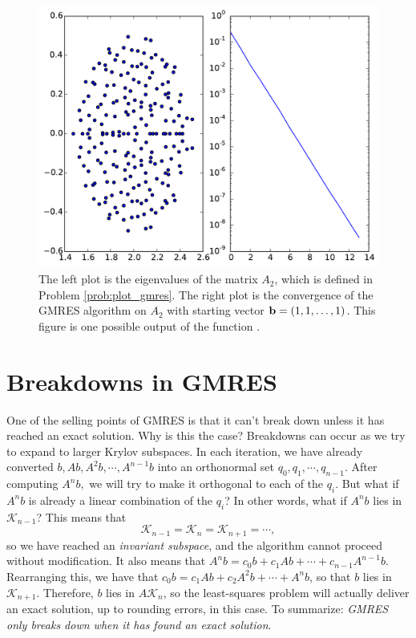 \begin{problem}
\begin{figure}[H]
\includegraphics[width=.7\textwidth]{plot_gmres.pdf}
\caption{The left plot is the eigenvalues of the matrix $A_2$, which is defined in Problem \ref{prob:plot_gmres}.
The right plot is the convergence of the GMRES algorithm on $A_2$ with starting vector ${\bf b} = (1, 1, \ldots, 1)$.
This figure is one possible output of the function .}
\label{fig:plot_gmres}
\end{figure}
\end{problem}



\section*{Breakdowns in GMRES}
One of the selling points of GMRES is that it can't break down unless it has reached an exact solution.
Why is this the case?
Breakdowns can occur as we try to expand to larger Krylov subspaces.
In each iteration, we have already converted $b,Ab,A^{2}b,\cdots, A^{n-1}b$ into an orthonormal set $q_0,q_1,\cdots,q_{n-1}$.
After computing $A^nb,$ we will try to make it orthogonal to each of the $q_i$.
But what if $A^{n}b$ is already a linear combination of the $q_i$? In other words, what if $A^{n}b$ lies in $\mathcal{K}_{n-1}$?
This means that
\[
\mathcal{K}_{n-1}=\mathcal{K}_n=\mathcal{K}_{n+1}=\cdots,
\]
so we have reached an \emph{invariant subspace},
and the algorithm cannot proceed without modification.
It also means that $A^{n}b = c_0 b + c_1 A b + \cdots + c_{n-1}A^{n-1}b$.
Rearranging this, we have that $c_0 b = c_1 A b + c_2 A^{2} b + \cdots + A^{n}b$, so that $b$ lies in $\mathcal{K}_{n+1}$.
Therefore, $b$ lies in $A\mathcal{K}_n$, so the least-squares problem will actually deliver an exact solution, up to rounding errors,
in this case.
To summarize: \emph{GMRES only breaks down when it has found an exact solution}.

